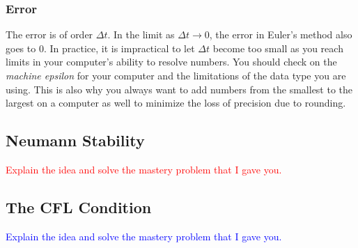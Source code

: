 \documentclass{article}
\newcommand{\red}[1]{\textcolor{red}{#1}}
\newcommand{\blue}[1]{\textcolor{blue}{#1}}
\begin{document}
\subsubsection{Error} The error is of order $\Delta t$. In the limit as $\Delta t \to 0$, the error in Euler's
method also goes to 0. In practice, it is impractical to let $\Delta t$ become
too small as you reach limits in your computer's ability to resolve
numbers. You should check on the \emph{machine epsilon} \label{machineepsilon} for your computer and
the limitations of the data type you are using. This is also why you always want to add numbers
from the smallest to the largest on a computer as well to minimize the loss of
precision due to rounding.
\subsection{Neumann Stability}
\red{Explain the idea and solve the mastery problem that I gave you.}
 \subsection{The CFL Condition}
\blue{Explain the idea and solve the mastery problem that I gave you.}
 
\end{document}
